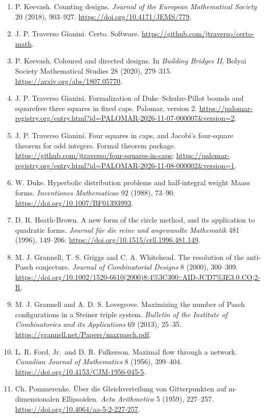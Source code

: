 \documentclass[english,11pt,a4paper]{article}
\begin{document}
\begin{enumerate}
\item
  P. Keevash. Counting designs. \emph{Journal of the European Mathematical Society} 20 (2018), 903--927. \url{https://doi.org/10.4171/JEMS/779}.
\item
  J. P. Traverso Gianini. Certo. Software. \url{https://github.com/jtraverso/certo-math}.
\item
  P. Keevash. Coloured and directed designs. In \emph{Building Bridges II}, Bolyai Society Mathematical Studies 28 (2020), 279--315. \url{https://arxiv.org/abs/1807.05770}.
\item
  J. P. Traverso Gianini. Formalization of Duke--Schulze-Pillot bounds and squarefree three squares in fixed caps. Palomar, version 2. \url{https://palomar-registry.org/entry.html?id=PALOMAR-2026-11-07-000007&version=2}.
\item
  J. P. Traverso Gianini. Four squares in caps, and Jacobi's four-square theorem for odd integers. Formal theorem package. \url{https://github.com/jtraverso/four-squares-in-caps}; \url{https://palomar-registry.org/entry.html?id=PALOMAR-2026-11-08-000002&version=1}.
\item
  W. Duke. Hyperbolic distribution problems and half-integral weight Maass forms. \emph{Inventiones Mathematicae} 92 (1988), 73--90. \url{https://doi.org/10.1007/BF01393993}.
\item
  D. R. Heath-Brown. A new form of the circle method, and its application to quadratic forms. \emph{Journal für die reine und angewandte Mathematik} 481 (1996), 149--206. \url{https://doi.org/10.1515/crll.1996.481.149}.
\item
  M. J. Grannell, T. S. Griggs and C. A. Whitehead. The resolution of the anti-Pasch conjecture. \emph{Journal of Combinatorial Designs} 8 (2000), 300--309. \url{https://doi.org/10.1002/1520-6610(2000)8:4\%3C300::AID-JCD7\%3E3.0.CO;2-R}.
\item
  M. J. Grannell and A. D. S. Lovegrove. Maximizing the number of Pasch configurations in a Steiner triple system. \emph{Bulletin of the Institute of Combinatorics and its Applications} 69 (2013), 25--35. \url{https://grannell.net/Papers/maxpasch.pdf}.
\item
  L. R. Ford, Jr.~and D. R. Fulkerson. Maximal flow through a network. \emph{Canadian Journal of Mathematics} 8 (1956), 399--404. \url{https://doi.org/10.4153/CJM-1956-045-5}.
\item
  Ch. Pommerenke. Über die Gleichverteilung von Gitterpunkten auf m-dimensionalen Ellipsoiden. \emph{Acta Arithmetica} 5 (1959), 227--257. \url{https://doi.org/10.4064/aa-5-2-227-257}.
\end{enumerate}
\end{document}
